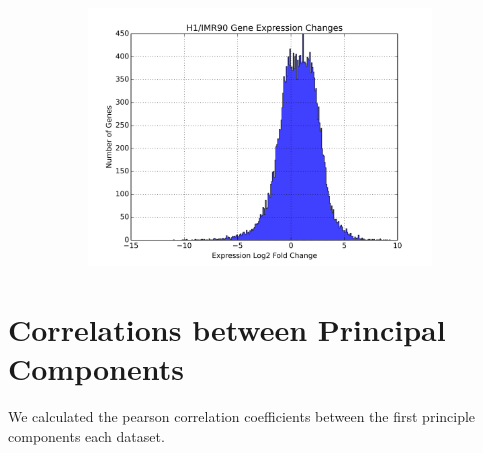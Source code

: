 \begin{figure}
  \quad

  \begin{subfigure}[b]{0.45\textwidth}
    \includegraphics[width=\textwidth]{./fig/supplementary/expressionDelta.png}\label{fig:i90h1expression}
  \end{subfigure}
\end{figure}

\section*{Correlations between Principal Components}

We calculated the pearson correlation coefficients between the first principle components each dataset.

